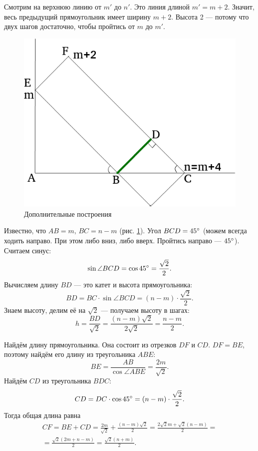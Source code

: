 \documentclass{book}
\begin{document}
Смотрим на верхнюю линию от $m'$ до $n'$.
Это линия длиной $m' = m + 2$.
Значит, весь предыдущий прямоугольник имеет ширину $m + 2$.
Высота 2 --- потому что двух шагов достаточно, чтобы пройтись от $m$ до $m'$.

\begin{figure}[h!]
  \centering
  \includegraphics[width=.6\textwidth]{./pictures/4_22_8.png}
  \caption{Дополнительные построения}
  \label{fig:4228}
\end{figure}

Известно, что $AB = m, \, BC = n - m$ (рис. \ref{fig:4228}).
Угол $BCD = 45 \degree$ (можем всегда ходить направо.
При этом либо вниз, либо вверх.
Пройтись направо --- $45 \degree$).
Считаем синус:
$$ \sin \angle BCD =
\cos 45 \degree =
\frac{ \sqrt{2} }{2}.$$
Вычисляем длину $BD$ --- это катет и высота прямоугольника:
$$BD =
BC \cdot \sin \angle BCD =
\left( n-m \right) \cdot \frac{ \sqrt{2} }{2}.$$
Знаем высоту, делим её на $ \sqrt{2} $ --- получаем высоту в шагах:
$$h =
\frac{BD}{ \sqrt{2} } =
\frac{ \left( n-m \right) \sqrt{2} }{2 \sqrt{2} } =
\frac{n-m}{2}.$$

Найдём длину прямоугольника. Она состоит из отрезков $DF$ и $CD$.
$DF = BE$, поэтому найдём его длину из треугольника $ABE$:
$$BE =
\frac{AB}{ \cos \angle ABE} =
\frac{2m}{ \sqrt{2} }.$$
Найдём $CD$ из треугольника $BDC$:
$$CD =
DC \cdot \cos 45 \degree =
\left( n-m \right) \cdot \frac{ \sqrt{2} }{2}.$$
Тогда общая длина равна
\begin{equation*}
\begin{split}
CF =
BE + CD =
\frac{2m}{ \sqrt{2} } + \frac{ \left( n-m \right) \sqrt{2} }{2} =
\frac{2 \sqrt{2} m + \sqrt{2} \left( n-m \right) }{2} = \\
= \frac{ \sqrt{2} \left( 2m+n-m \right) }{2} =
\frac{ \sqrt{2} \left( n+m \right) }{2}.
\end{split}
\end{equation*}
\end{document}

